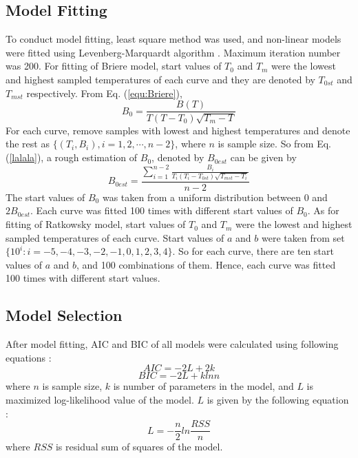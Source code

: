 \documentclass[11pt]{article}
\begin{document}
  \subsection{Model Fitting} 
    To conduct model fitting, least square method was used, and non-linear models were fitted using Levenberg-Marquardt  
    algorithm \cite{ranganathan2004levenberg, lourakis2005brief}. Maximum iteration number was 200.  
    \newline 
    For fitting of Briere model, start values of $T_0$ and $T_m$ were the lowest and highest sampled temperatures 
    of each curve and they are denoted by $T_{0st}$ and $T_{mst}$ respectively. From Eq. (\ref{equ:Briere}), 
    \begin{equation}\label{lalala} 
    B_0 = \frac{B(T)}{T (T - T_0) \sqrt{T_m - T}} 
    \end{equation} 
    For each curve, remove samples with lowest and highest temperatures and denote the rest as  
    $\{(T_i, B_i), i = 1,2,\cdots,n-2\}$, where $n$ is sample size.  
    So from Eq. (\ref{lalala}), a rough estimation of $B_0$, denoted by $B_{0est}$ can be given by  
    \begin{equation}\label{esti} 
    B_{0est} = \frac{\sum_{i=1}^{n-2}\frac{B_i}{T_i (T_i - T_{0st}) \sqrt{T_{mst} - T_i}}}{n-2} 
    \end{equation} 
    The start values of $B_0$ was taken from a uniform distribution between $0$ and $2B_{0est}$. 
    Each curve was fitted 100 times with different start values of $B_0$. 
    \newline 
    As for fitting of Ratkowsky model, start values of $T_0$ and $T_m$ were the lowest and highest sampled temperatures 
    of each curve. Start values of $a$ and $b$ were taken from set  
    $\{10^i: i = -5,-4,-3,-2,-1,0,1,2,3,4\}$. So for each curve, there are ten start values of $a$ and $b$,  
    and 100 combinations of them. Hence, each curve was fitted 100 times with different start values.

  \subsection{Model Selection}
  After model fitting, AIC and BIC of all models  
  were calculated using  
  following equations \cite{johnson2004model}: 
  \begin{equation} 
  AIC = -2L + 2k 
  \end{equation} 
  \begin{equation} 
  BIC = -2L + klnn 
  \end{equation} 
  where $n$ is sample size, $k$ is number of parameters in the model, and $L$ is maximized log-likelihood value of the model. 
  $L$ is given by the following equation \cite{johnson2004model}: 
  \begin{equation} 
  L = -\frac{n}{2}ln\frac{RSS}{n} 
  \end{equation} 
  where $RSS$ is residual sum of squares of the model. 
 
\end{document}
